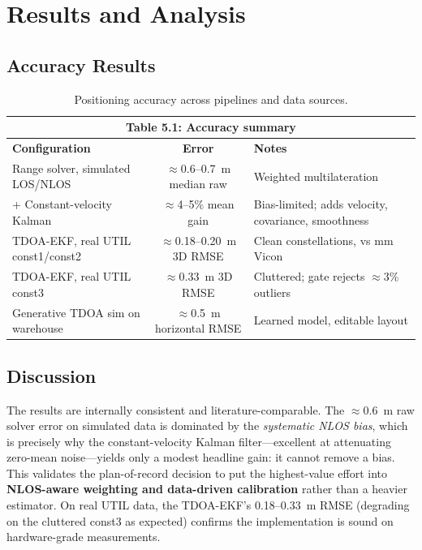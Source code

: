 \documentclass[a4paper,12pt,onecolumn]{report}
\begin{document}
\chapter{Results and Analysis}

\section{Accuracy Results}
\begin{table}[H]
\begin{center}
\begin{tabular}{ | p{6.2cm} | c | p{4.5cm} | }
\hline
\multicolumn{3}{|c|}{\textbf{Table 5.1: Accuracy summary}}\\
\hline
\textbf{Configuration} & \textbf{Error} & \textbf{Notes}\\ \hline
Range solver, simulated LOS/NLOS & $\approx$0.6--0.7~m median raw & Weighted
multilateration \\ \hline
+ Constant-velocity Kalman & $\approx$4--5\% mean gain & Bias-limited; adds
velocity, covariance, smoothness \\ \hline
TDOA-EKF, real UTIL const1/const2 & $\approx$0.18--0.20~m 3D RMSE & Clean
constellations, vs mm Vicon \\ \hline
TDOA-EKF, real UTIL const3 & $\approx$0.33~m 3D RMSE & Cluttered; gate rejects
$\approx$3\% outliers \\ \hline
Generative TDOA sim on warehouse & $\approx$0.5~m horizontal RMSE & Learned model,
editable layout \\
\hline
\end{tabular}
\caption{Positioning accuracy across pipelines and data sources.}
\label{tab:accuracy}
\end{center}
\end{table}

\section{Discussion}
The results are internally consistent and literature-comparable. The
$\approx$0.6~m raw solver error on simulated data is dominated by the
\emph{systematic NLOS bias}, which is precisely why the constant-velocity Kalman
filter---excellent at attenuating zero-mean noise---yields only a modest headline
gain: it cannot remove a bias. This validates the plan-of-record decision to put
the highest-value effort into \textbf{NLOS-aware weighting and data-driven
calibration} rather than a heavier estimator. On real UTIL data, the TDOA-EKF's
0.18--0.33~m RMSE (degrading on the cluttered const3 as expected) confirms the
implementation is sound on hardware-grade measurements.
\end{document}
